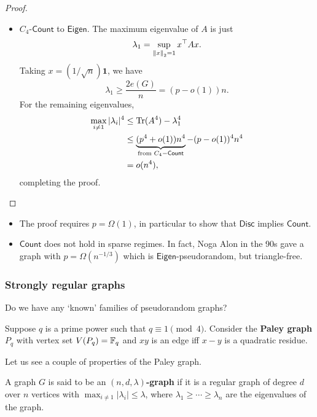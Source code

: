 \begin{proof}
\begin{itemize}
					\item $C_4$-$\mathsf{Count}$ to $\mathsf{Eigen}$. The maximum eigenvalue of $A$ is just
					\[ \lambda_1 = \sup_{\left\lVert x\right\rVert_2 = 1} x^\top A x. \]
					Taking $x = (1/\sqrt{n})\mathbf{1}$, we have
					\[ \lambda_1 \ge \frac{2e(G)}{n} = (p - o(1))n. \]
					For the remaining eigenvalues,
					\begin{align*}
						\max_{i\ne 1} |\lambda_i|^4 &\le \operatorname{Tr}(A^4) - \lambda_1^4 \\
							&\le \underbrace{(p^4 + o(1))n^4}_{\text{from }C_4-\mathsf{Count}} - (p - o(1))^4 n^4 \\
							&= o(n^4),
					\end{align*}
					completing the proof.
				\end{itemize}
			\end{proof}

			\begin{remark}
				\begin{itemize}
					\item The proof requires $p = \Omega(1)$, in particular to show that $\mathsf{Disc}$ implies $\mathsf{Count}$.
					\item $\mathsf{Count}$ does not hold in sparse regimes. In fact, Noga Alon in the 90s gave a graph with $p = \Omega(n^{-1/3})$ which is $\mathsf{Eigen}$-pseudorandom, but triangle-free.
				\end{itemize}
			\end{remark}

		\subsubsection{Strongly regular graphs}

			Do we have any `known' families of pseudorandom graphs?

			\begin{fdef}
				Suppose $q$ is a prime power such that $q \equiv 1 \pmod{4}$. Consider the \textbf{Paley graph} $P_q$ with vertex set $V(P_q) = \mathbb{F}_q$ and $xy$ is an edge iff $x-y$ is a quadratic residue\footnotemark.
			\end{fdef}
			\footnotetext{$x-y = a^2$ for some $a\in\F_q^\times$.}

			Let us see a couple of properties of the Paley graph.

			\begin{fdef}
				A graph $G$ is said to be an \textbf{$(n,d,\lambda)$-graph} if it is a regular graph of degree $d$ over $n$ vertices with $\max_{i\ne 1} |\lambda_i| \le \lambda$, where $\lambda_1 \ge \cdots \ge \lambda_n$ are the eigenvalues of the graph.
			\end{fdef}

